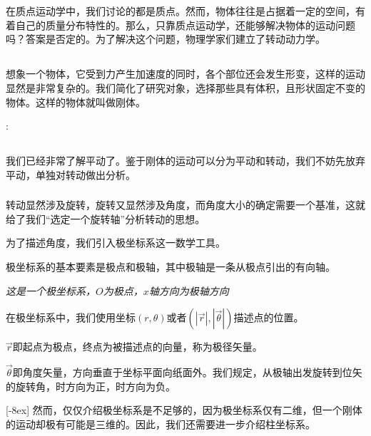 \chapter[转动动力学]{}
在质点运动学中，我们讨论的都是质点。然而，物体往往是占据着一定的空间，有着自己的质量分布特性的。那么，只靠质点运动学，还能够解决物体的运动问题吗？答案是否定的。为了解决这个问题，物理学家们建立了转动动力学。
\section[刚体]{}
想象一个物体，它受到力产生加速度的同时，各个部位还会发生形变，这样的运动显然是非常复杂的。我们简化了研究对象，选择那些具有体积，且形状固定不变的物体。这样的物体就叫做刚体。
\begin{Itemize}
	\item {}:
\end{Itemize}
\section[转动]{}
我们已经非常了解平动了。鉴于刚体的运动可以分为平动和转动，我们不妨先放弃平动，单独对转动做出分析。

\subsection[极坐标系]{}
转动显然涉及旋转，旋转又显然涉及角度，而角度大小的确定需要一个基准，这就给了我们“选定一个旋转轴”分析转动的思想。

为了描述角度，我们引入极坐标系这一数学工具。

极坐标系的基本要素是极点和极轴，其中极轴是一条从极点引出的有向轴。
\begin{center}
	\em 这是一个极坐标系，$O$为极点，$x$轴方向为极轴方向
\end{center}
在极坐标系中，我们使用坐标$(r,\theta)$或者$(|\vec{r}|,|\vec{\theta}|)$描述点的位置。
\begin{Itemize}
	\item $\vec{r}$即起点为极点，终点为被描述点的向量，称为极径矢量。
	\item $\vec{\theta}$即角度矢量，方向垂直于坐标平面向纸面外。我们规定，从极轴出发旋转到位矢的旋转角，时方向为正，时方向为负\footnotemark。
\end{Itemize}
[-8ex]
然而，仅仅介绍极坐标系是不足够的，因为极坐标系仅有二维，但一个刚体的运动却极有可能是三维的。因此，我们还需要进一步介绍柱坐标系。


